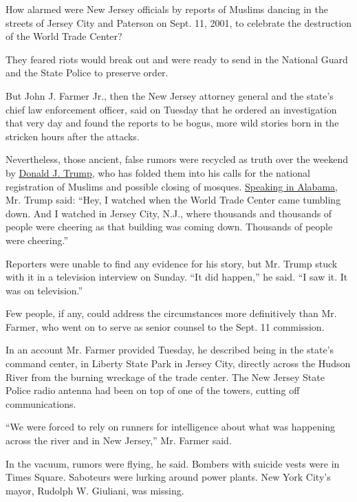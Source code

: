 How alarmed were New Jersey officials by reports of Muslims dancing in
the streets of Jersey City and Paterson on Sept. 11, 2001, to celebrate
the destruction of the World Trade Center?

They feared riots would break out and were ready to send in the National
Guard and the State Police to preserve order.

But John J. Farmer Jr., then the New Jersey attorney general and the
state's chief law enforcement officer, said on Tuesday that he ordered
an investigation that very day and found the reports to be bogus, more
wild stories born in the stricken hours after the attacks.

Nevertheless, those ancient, false rumors were recycled as truth over
the weekend by
\href{http://www.nytimes3xbfgragh.onion/interactive/2015/06/16/us/elections/donald-trump.html?inline=nyt-per}{Donald
J. Trump}, who has folded them into his calls for the national
registration of Muslims and possible closing of mosques.
\href{http://www.nytimes3xbfgragh.onion/2015/11/22/us/politics/donald-trump-syrian-muslims-surveillance.html?_r=0}{Speaking
in Alabama}, Mr. Trump said: ``Hey, I watched when the World Trade
Center came tumbling down. And I watched in Jersey City, N.J., where
thousands and thousands of people were cheering as that building was
coming down. Thousands of people were cheering.''

Reporters were unable to find any evidence for his story, but Mr. Trump
stuck with it in a television interview on Sunday. ``It did happen,'' he
said. ``I saw it. It was on television.''

Few people, if any, could address the circumstances more definitively
than Mr. Farmer, who went on to serve as senior counsel to the Sept. 11
commission.

In an account Mr. Farmer provided Tuesday, he described being in the
state's command center, in Liberty State Park in Jersey City, directly
across the Hudson River from the burning wreckage of the trade center.
The New Jersey State Police radio antenna had been on top of one of the
towers, cutting off communications.

``We were forced to rely on runners for intelligence about what was
happening across the river and in New Jersey,'' Mr. Farmer said.

In the vacuum, rumors were flying, he said. Bombers with suicide vests
were in Times Square. Saboteurs were lurking around power plants. New
York City's mayor, Rudolph W. Giuliani, was missing.

